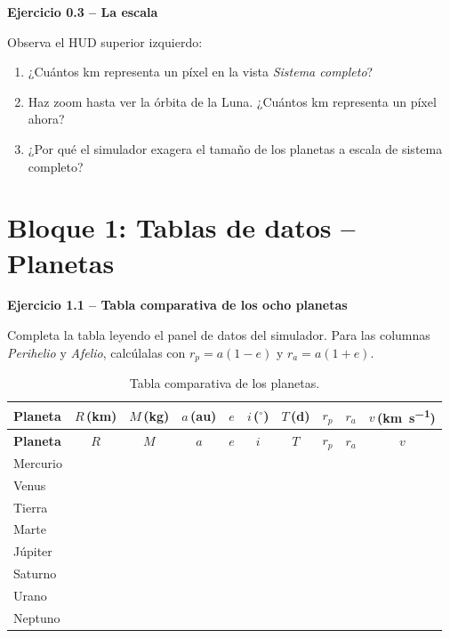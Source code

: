 \documentclass[11pt,a4paper]{article}
\newenvironment{cajaEjercicio}[1][]{\par\medskip\noindent\textbf{#1}\par\smallskip}{\par\medskip}
\theoremstyle{definition}
\begin{document}
\begin{cajaEjercicio}[Ejercicio 0.3 -- La escala]
Observa el HUD superior izquierdo:
\begin{enumerate}[label=\alph*),leftmargin=*]
  \item ¿Cuántos \si{\kilo\metre} representa un píxel en la vista \emph{Sistema completo}?
  \item Haz zoom hasta ver la órbita de la Luna. ¿Cuántos \si{\kilo\metre} representa un píxel ahora?
  \item ¿Por qué el simulador exagera el tamaño de los planetas a escala de sistema completo?
\end{enumerate}
\end{cajaEjercicio}

\section{Bloque 1: Tablas de datos -- Planetas}

\begin{cajaEjercicio}[Ejercicio 1.1 -- Tabla comparativa de los ocho planetas]
Completa la tabla leyendo el panel de datos del simulador. Para las columnas \emph{Perihelio} y \emph{Afelio}, calcúlalas con $r_p = a(1-e)$ y $r_a = a(1+e)$.

\begin{longtable}{@{}l*{9}{c}@{}}
\caption{Tabla comparativa de los planetas.} \\
\toprule
\textbf{Planeta} & $R$\,(\si{\kilo\metre}) & $M$\,(\si{\kilo\gram}) & $a$\,(\si{\astronomicalunit}) & $e$ & $i$\,($^{\circ}$) & $T$\,(\si{\day}) & $r_p$ & $r_a$ & $v$\,(\si{\kilo\metre\per\second}) \\
\midrule
\endfirsthead
\toprule
\textbf{Planeta} & $R$ & $M$ & $a$ & $e$ & $i$ & $T$ & $r_p$ & $r_a$ & $v$ \\
\midrule
\endhead
Mercurio & & & & & & & & & \\
Venus    & & & & & & & & & \\
Tierra   & & & & & & & & & \\
Marte    & & & & & & & & & \\
Júpiter  & & & & & & & & & \\
Saturno  & & & & & & & & & \\
Urano    & & & & & & & & & \\
Neptuno  & & & & & & & & & \\
\bottomrule
\end{longtable}
\end{cajaEjercicio}
\end{document}
